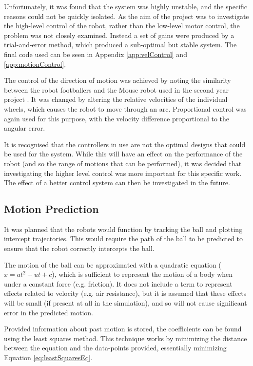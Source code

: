 \documentclass[10pt]{article}
\begin{document}
Unfortunately, it was found that the system was highly unstable, and the
specific reasons could not be quickly isolated.  As the aim of the project was
to investigate the high-level control of the robot, rather than the low-level
motor control, the problem was not closely examined.  Instead a set of gains
were produced by a trial-and-error method, which produced a sub-optimal but
stable system.  The final code used can be seen in Appendix \ref{app:velControl}
and \ref{app:motionControl}.

The control of the direction of motion was achieved by noting the similarity
between the robot footballers and the Mouse robot used in the second year
project \cite{mouseProjectReport}.  It was changed by altering the relative
velocities of the individual wheels, which causes the robot to move through an
arc.  Proportional control was again used for this purpose, with the velocity
difference proportional to the angular error.

It is recognised that the controllers in use are not the optimal designs that
could be used for the system.  While this will have an effect on the performance
of the robot (and so the range of motions that can be performed), it was decided
that investigating the higher level control was more important for this specific
work.  The effect of a better control system can then be investigated in the
future.

\subsection{Motion Prediction}
It was planned that the robots would function by tracking the ball and plotting
intercept trajectories.  This would require the path of the ball to be predicted
to ensure that the robot correctly intercepts the ball.

The motion of the ball can be approximated with a quadratic equation
($x=at^2+ut+c$), which is sufficient to represent the motion of a body when
under a constant force (e.g. friction).  It does not include a term to represent
effects related to velocity (e.g. air resistance), but it is assumed that these
effects will be small (if present at all in the simulation), and so will not
cause significant error in the predicted motion.

Provided information about past motion is stored, the coefficients can be found
using the least squares method. This technique works by minimizing the distance
between the equation and the data-points provided, essentially minimizing
Equation \ref{eq:leastSquaresEq}.
\end{document}
